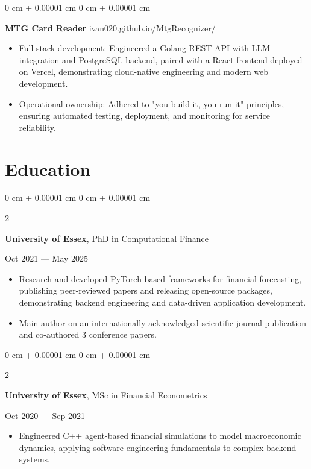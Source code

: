 \documentclass[6pt, letterpaper]{article}
\newenvironment{highlights}{
    \begin{itemize}[
        topsep=0.03 cm,
        parsep=0.03 cm,
        partopsep=0pt,
        itemsep=0pt,
        leftmargin=0 cm + 10pt
    ]
}{
    \end{itemize}
} %
\newenvironment{onecolentry}{
    \begin{adjustwidth}{
        0 cm + 0.00001 cm
    }{
        0 cm + 0.00001 cm
    }
}{
    \end{adjustwidth}
} %
\newenvironment{twocolentry}[2][]{
    \onecolentry
    \def\secondColumn{#2}
    \setcolumnwidth{\fill, 4.5 cm}
    \begin{paracol}{2}
}{
    \switchcolumn \raggedleft \secondColumn
    \end{paracol}
    \endonecolentry
} %
\begin{document}
    \begin{onecolentry}
        \textbf{MTG Card Reader} \hfill ivan020.github.io/MtgRecognizer/

        \begin{highlights}
            \item Full-stack development: Engineered a Golang REST API with LLM integration and PostgreSQL backend, paired with a React frontend deployed on Vercel, demonstrating cloud-native engineering and modern web development.
            \item Operational ownership: Adhered to "you build it, you run it" principles, ensuring automated testing, deployment, and monitoring for service reliability.

        \end{highlights}
    \end{onecolentry}



    \section{Education}

            \begin{twocolentry}{
                Oct 2021 --- May 2025
            }
            \textbf{University of Essex}, PhD in Computational Finance
            \end{twocolentry}

            \begin{highlights}
            \item Research and developed PyTorch-based frameworks for financial forecasting, publishing peer-reviewed papers and releasing open-source packages, demonstrating backend engineering and data-driven application development.
            \item Main author on an internationally acknowledged scientific journal publication and co-authored 3 conference papers.
            \end{highlights}

            \begin{twocolentry}{
                Oct 2020 --- Sep 2021
            }
            \textbf{University of Essex}, MSc in Financial Econometrics
            \end{twocolentry}

            \begin{highlights}
            \item Engineered C++ agent-based financial simulations to model macroeconomic dynamics, applying software engineering fundamentals to complex backend systems.
            \end{highlights}
\end{document}
